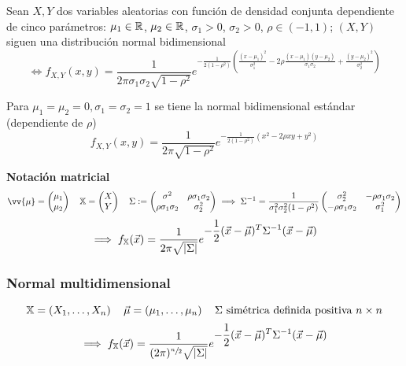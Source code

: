 \begin{ejem}
	Sean $X, Y$ dos variables aleatorias con función de densidad conjunta dependiente de cinco parámetros: $\mu_1\in\mathbb{R}$, $\mu_2\in\mathbb{R}$, $\sigma_1>0$, $\sigma_2>0$, $\rho\in (-1, 1)$; $(X, Y)$ siguen una distribución normal bidimensional
	\[\iff f_{X, Y}(x, y) = \frac{1}{2\pi \sigma_1 \sigma_2 \sqrt{1-\rho^2}} e^{-\frac{1}{2(1-\rho^2)}\left(\frac{(x-\mu_1)^2}{\sigma_1^2} - 2\rho\frac{(x-\mu_1)(y-\mu_2)}{\sigma_1\sigma_2} + \frac{(y-\mu_2)^2}{\sigma_2^2}\right)}\]

	Para $\mu_1 = \mu_2 = 0, \sigma_1 = \sigma_2 = 1$ se tiene la normal bidimensional estándar (dependiente de $\rho$)
	\[f_{X, Y}(x, y) = \frac{1}{2\pi \sqrt{1-\rho^2}} e^{-\frac{1}{2(1-\rho^2)}\left(x^2 - 2\rho x y + y^2\right)}\]

	\textbf{Notación matricial}
	\[\vv{\mu} = \begin{pmatrix}
			\mu_1 \\
			\mu_2
		\end{pmatrix} \quad \mathbb{X} = \begin{pmatrix}
			X \\
			Y
		\end{pmatrix} \quad \Sigma \defeq \begin{pmatrix}
			\sigma^2               & \rho \sigma_1 \sigma_2 \\
			\rho \sigma_1 \sigma_2 & \sigma_2^2
		\end{pmatrix} \implies \Sigma^{-1} = \frac{1}{\sigma_1^2\sigma_2^2(1 - \rho^2)} \begin{pmatrix}
			\sigma_2^2              & -\rho \sigma_1 \sigma_2 \\
			-\rho \sigma_1 \sigma_2 & \sigma_1^2
		\end{pmatrix}\]
	\[\implies f_\mathbb{X}(\vec{x}) = \frac{1}{2\pi \sqrt{\left|\Sigma\right|}} e^{\displaystyle -\frac{1}{2} (\vec{x} - \vec{\mu})^T \Sigma^{-1} (\vec{x} - \vec{\mu})}\]
\end{ejem}

\subsubsection{Normal multidimensional}
\[\mathbb{X} = \left(X_1, \dots, X_n\right) \quad \vec{\mu} = \left(\mu_1, \dots, \mu_n\right)
	\quad \Sigma \text{ simétrica definida positiva $n\times n$}\]
\[\implies f_\mathbb{X} (\vec{x})= \frac{1}{(2\pi)^{\sfrac{n}{2}} \sqrt{\left|\Sigma\right|}} e^{\displaystyle -\frac{1}{2} (\vec{x} - \vec{\mu})^T \Sigma^{-1} (\vec{x} - \vec{\mu})}\]

